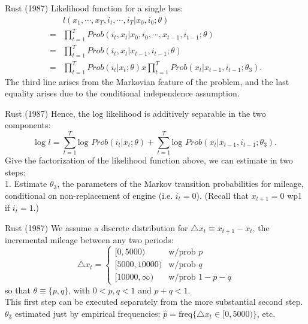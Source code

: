 \documentclass[xcolor=pdftex,dvipsnames,table,mathserif]{beamer}
\begin{document}
\begin{frame}{Rust (1987)}
Likelihood function for a single bus:
\begin{equation}
\begin{split}
& l (x_1, \cdots , x_T, i_t, \cdots , i_T | x_0, i_0 ; \theta) \\
= & \prod^T_{t=1} Prob (i_t, x_t | x_0, i_0, \cdots , x_{t-1}, i_{t-1} ; \theta) \\
= & \prod^T_{t=1} Prob (i_t, x_t |  x_{t-1}, i_{t-1} ; \theta) \\
= & \prod^T_{t=1} Prob (i_t | x_t; \theta) x \prod^T_{t=1} Prob (x_t | x_{t-1}, i_{t-1} ; \theta_3) .
\end{split}
\end{equation}
The third line arises from the Markovian feature of the problem, and the last equality arises due to the conditional independence assumption. 
\end{frame}

\begin{frame}{Rust (1987)}
Hence, the log likelihood is additively separable in the two components:
\begin{equation*}
\text{log } l = \sum^T_{t=1} \text{log } Prob (i_t | x_t ; \theta) + \sum^T_{t=1} \text{log } Prob (x_t | x_{t-1}, i_{t-1}; \theta_3).
\end{equation*}
Give the factorization of the likelihood function above, we can estimate in two steps: \\
\vspace{3mm}
1. Estimate $\theta_3$, the parameters of the Markov transition probabilities for mileage, conditional on non-replacement of engine (i.e. $i_t = 0$). (Recall that $x_{t+1} = 0$ wp1 if $i_t = 1$.)
\end{frame}

\begin{frame}{Rust (1987)}
We assume a discrete distribution for $\triangle x_t \equiv x_{t+1} - x_t$, the incremental mileage between any two periods:
\begin{equation*}
\triangle x_t = \left \{ 
\begin{matrix}
[0, 5000) & \text{w/prob } p \\
[5000, 10000) & \text{w/prob } q \\
[10000, \infty) & \text{w/prob } 1 - p - q  
\end{matrix}
\right .
\end{equation*}
so that $\theta \equiv \{p, q \}$, with $0 < p, q< 1$ and $p + q < 1$. \\
\vspace{2mm}
This first step can be executed separately from the more substantial second step. $\theta_3$ estimated just by empirical frequencies: $\hat p = \text{freq} \{ \triangle x_t \in  [0, 5000) \}$, etc. 
\end{frame}
\end{document}
